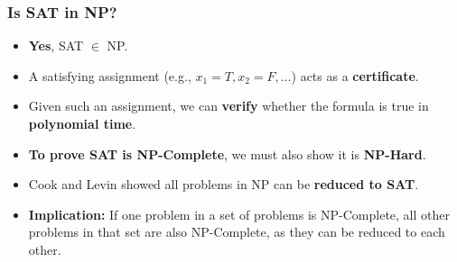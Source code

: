 \documentclass[10pt,aspectratio=43]{beamer}
\begin{document}
\begin{frame}
    \frametitle{Is SAT in NP?}

    \begin{itemize}
        \item \textbf{Yes}, SAT $\in$ NP.
        \item A satisfying assignment (e.g., $x_1 = T, x_2 = F, \dots$) acts as a \textbf{certificate}.
        \item Given such an assignment, we can \textbf{verify} whether the formula is true in \textbf{polynomial time}.
        \item \textbf{To prove SAT is NP-Complete}, we must also show it is \textbf{NP-Hard}.
        \item Cook and Levin showed all problems in NP can be \textbf{reduced to SAT}.
        \item \textbf{Implication:} If one problem in a set of problems is NP-Complete, all other problems in that set are also NP-Complete, as they can be reduced to each other.
    \end{itemize}
\end{frame}



\end{document}
